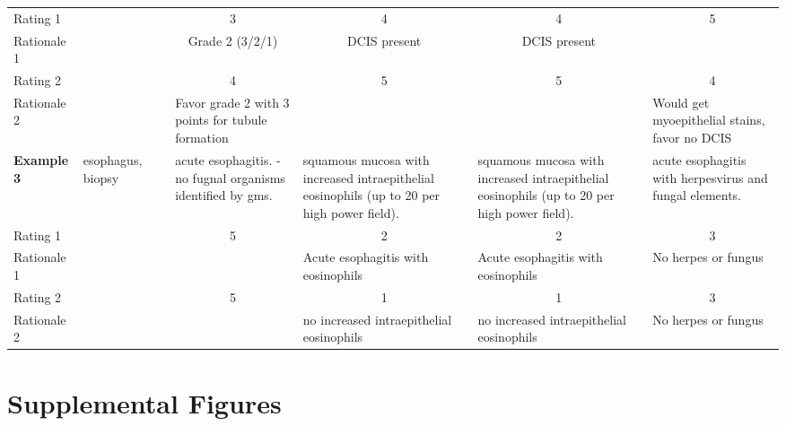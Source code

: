 \documentclass[11pt]{article}
\begin{document}
\begin{table}[h]
\begin{tabular}{l p{1cm} >{\centering\arraybackslash}p{1cm} p{2.5cm} p{2.5cm} p{2.5cm} p{2.5cm}}
\hline
Rating 1 & & & \multicolumn{1}{c}{3} & \multicolumn{1}{c}{4} & \multicolumn{1}{c}{4} & \multicolumn{1}{c}{5} \\ 
Rationale 1 & & & \multicolumn{1}{c}{Grade 2 (3/2/1)} & \multicolumn{1}{c}{DCIS present}  & \multicolumn{1}{c}{DCIS present} &  \\
\hline
Rating 2 & & & \multicolumn{1}{c}{4} & \multicolumn{1}{c}{5} & \multicolumn{1}{c}{5} & \multicolumn{1}{c}{4} \\
Rationale 2 & & & Favor grade 2 with 3 points for tubule formation  & & & Would get myoepithelial stains, favor no DCIS \\
\midrule
\textbf{Example 3} & esophagus, biopsy &  3 & acute esophagitis. - no fugnal organisms identified by gms. & squamous mucosa with increased intraepithelial eosinophils (up to 20 per high power field). & squamous mucosa with increased intraepithelial eosinophils (up to 20 per high power field). & acute esophagitis with herpesvirus and fungal elements.  \\
\hline
Rating 1 & & & \multicolumn{1}{c}{5} & \multicolumn{1}{c}{2} & \multicolumn{1}{c}{2} & \multicolumn{1}{c}{3} \\ 
Rationale 1 & & & & Acute esophagitis with eosinophils & Acute esophagitis with eosinophils & No herpes or fungus \\
\hline
Rating 2 & & & \multicolumn{1}{c}{5} & \multicolumn{1}{c}{1} & \multicolumn{1}{c}{1} & \multicolumn{1}{c}{3} \\ 
Rationale 2 & & & & no increased intraepithelial eosinophils & no increased intraepithelial eosinophils & No herpes or fungus \\
\bottomrule
\end{tabular}
\label{tab:qualitativeexamples}
\end{table}

\clearpage
\section{Supplemental Figures}
\end{document}
